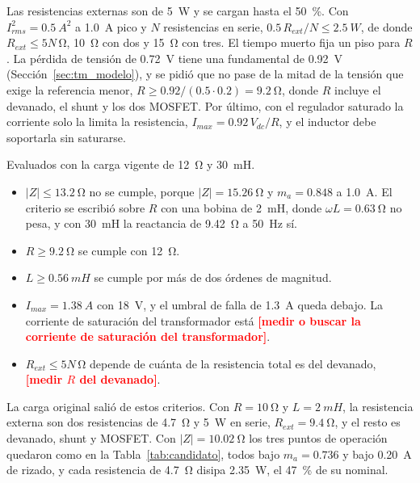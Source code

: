 \documentclass[journal]{IEEEtran}
\newcommand{\pendiente}[1]{\textcolor{red}{\textbf{[#1]}}}
\begin{document}
Las resistencias externas son de \SI{5}{W} y se cargan hasta el \SI{50}{\percent}. Con $I_{rms}^2=\SI{0.5}{A^2}$ a \SI{1.0}{A} pico y $N$ resistencias en serie, $0.5\,R_{ext}/N\le\SI{2.5}{W}$, de donde $R_{ext}\le5N\,\si{\ohm}$, \SI{10}{\ohm} con dos y \SI{15}{\ohm} con tres. El tiempo muerto fija un piso para $R$. La pérdida de tensión de \SI{0.72}{V} tiene una fundamental de \SI{0.92}{V} (Sección~\ref{sec:tm_modelo}), y se pidió que no pase de la mitad de la tensión que exige la referencia menor, $R\ge0.92/(0.5\cdot0.2)=\SI{9.2}{\ohm}$, donde $R$ incluye el devanado, el shunt y los dos MOSFET. Por último, con el regulador saturado la corriente solo la limita la resistencia, $I_{max}=0.92\,V_{dc}/R$, y el inductor debe soportarla sin saturarse.

Evaluados con la carga vigente de \SI{12}{\ohm} y \SI{30}{mH}.

\begin{itemize}
	\item $|Z|\le\SI{13.2}{\ohm}$ no se cumple, porque $|Z|=\SI{15.26}{\ohm}$ y $m_a=0.848$ a \SI{1.0}{A}. El criterio se escribió sobre $R$ con una bobina de \SI{2}{mH}, donde $\omega L=\SI{0.63}{\ohm}$ no pesa, y con \SI{30}{mH} la reactancia de \SI{9.42}{\ohm} a \SI{50}{Hz} sí.
	\item $R\ge\SI{9.2}{\ohm}$ se cumple con \SI{12}{\ohm}.
	\item $L\ge\SI{0.56}{mH}$ se cumple por más de dos órdenes de magnitud.
	\item $I_{max}=\SI{1.38}{A}$ con \SI{18}{V}, y el umbral de falla de \SI{1.3}{A} queda debajo. La corriente de saturación del transformador está \pendiente{medir o buscar la corriente de saturación del transformador}.
	\item $R_{ext}\le5N\,\si{\ohm}$ depende de cuánta de la resistencia total es del devanado, \pendiente{medir $R$ del devanado}.
\end{itemize}

La carga original salió de estos criterios. Con $R=\SI{10}{\ohm}$ y $L=\SI{2}{mH}$, la resistencia externa son dos resistencias de \SI{4.7}{\ohm} y \SI{5}{W} en serie, $R_{ext}=\SI{9.4}{\ohm}$, y el resto es devanado, shunt y MOSFET. Con $|Z|=\SI{10.02}{\ohm}$ los tres puntos de operación quedaron como en la Tabla~\ref{tab:candidato}, todos bajo $m_a=0.736$ y bajo \SI{0.20}{A} de rizado, y cada resistencia de \SI{4.7}{\ohm} disipa \SI{2.35}{W}, el \SI{47}{\percent} de su nominal.
\end{document}
